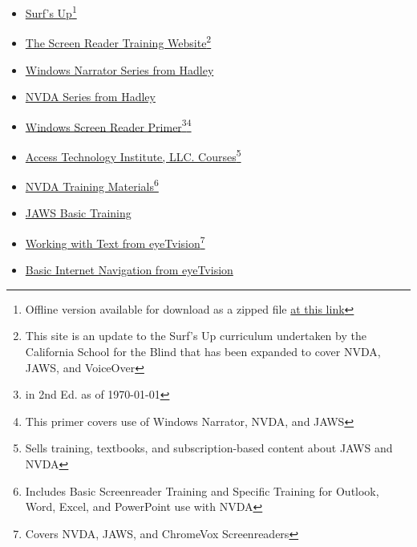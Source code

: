 \begin{itemize}[leftmargin=*]
 \item \href{https://www.freedomscientific.com/SurfsUp/}{Surf's Up}\footnote{\raggedright Offline version available for download as a zipped file \href{https://support.freedomscientific.com/SurfsUp/ZIP\_Surfs\_Up.zip}{at this link}}
 \item \href{https://srt.csb-cde.ca.gov/}{The Screen Reader Training Website}\footnote{\raggedright This site is an update to the Surf's Up curriculum undertaken by the California School for the Blind that has been expanded to cover NVDA, JAWS, and VoiceOver}
 \item \href{https://hadley.edu/workshops/windows-narrator-series}{Windows Narrator Series from Hadley}
 \item \href{https://hadley.edu/workshops/nvda-screen-reader-series}{NVDA Series from Hadley}
 \item \href{https://carroll.org/the-windows-screen-reader-primer-all-the-basics-and-more-second-edition/}{Windows Screen Reader Primer}\footnote{\raggedright in 2nd Ed. as of \today}\fnsep\footnote{\raggedright This primer covers use of Windows Narrator, NVDA, and JAWS}
 \item \href{https://www.blind.training/}{Access Technology Institute, LLC. Courses}\footnote{\raggedright Sells training, textbooks, and subscription-based content about JAWS and NVDA} 
 \item \href{https://www.nvaccess.org/product/nvda-productivity-bundle/}{NVDA Training Materials}\footnote{\raggedright Includes Basic Screenreader Training and Specific Training for Outlook, Word, Excel, and PowerPoint use with NVDA}
 \item \href{https://support.freedomscientific.com/Training/JAWS-Basic-Training.zip}{JAWS Basic Training}
 \item \href{https://eyetvision.org/screen-reader-curriculum-landing-page/\#wwt2}{Working with Text from eyeTvision}\footnote{\raggedright Covers NVDA, JAWS, and ChromeVox Screenreaders} 
 \item \href{https://eyetvision.org/screen-reader-curriculum-landing-page/\#bin2}{Basic Internet Navigation from eyeTvision}\footnotemark[\value{footnote}]
\end{itemize}

